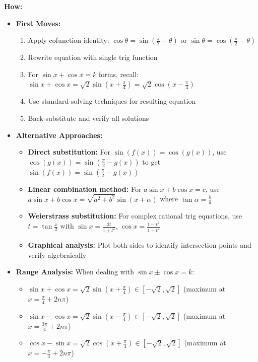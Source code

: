 \documentclass[12pt]{article}
\begin{document}
\textbf{How:}
\begin{itemize}
    \item \textbf{First Moves:} 
    \begin{enumerate}
        \item Apply cofunction identity: $\cos\theta = \sin\left(\frac{\pi}{2} - \theta\right)$ or $\sin\theta = \cos\left(\frac{\pi}{2} - \theta\right)$
        \item Rewrite equation with single trig function
        \item For $\sin x + \cos x = k$ forms, recall: $\sin x + \cos x = \sqrt{2}\sin(x + \frac{\pi}{4}) = \sqrt{2}\cos(x - \frac{\pi}{4})$
        \item Use standard solving techniques for resulting equation
        \item Back-substitute and verify all solutions
    \end{enumerate}
    \item \textbf{Alternative Approaches:}
    \begin{itemize}
        \item \textbf{Direct substitution:} For $\sin(f(x)) = \cos(g(x))$, use $\cos(g(x)) = \sin(\frac{\pi}{2} - g(x))$ to get $\sin(f(x)) = \sin(\frac{\pi}{2} - g(x))$
        \item \textbf{Linear combination method:} For $a\sin x + b\cos x = c$, use $a\sin x + b\cos x = \sqrt{a^2 + b^2}\sin(x + \alpha)$ where $\tan\alpha = \frac{b}{a}$
        \item \textbf{Weierstrass substitution:} For complex rational trig equations, use $t = \tan\frac{x}{2}$ with $\sin x = \frac{2t}{1+t^2}$, $\cos x = \frac{1-t^2}{1+t^2}$
        \item \textbf{Graphical analysis:} Plot both sides to identify intersection points and verify algebraically
    \end{itemize}
    \item \textbf{Range Analysis:} When dealing with $\sin x \pm \cos x = k$:
    \begin{itemize}
        \item $\sin x + \cos x = \sqrt{2}\sin(x + \frac{\pi}{4}) \in [-\sqrt{2}, \sqrt{2}]$ (maximum at $x = \frac{\pi}{4} + 2n\pi$)
        \item $\sin x - \cos x = \sqrt{2}\sin(x - \frac{\pi}{4}) \in [-\sqrt{2}, \sqrt{2}]$ (maximum at $x = \frac{3\pi}{4} + 2n\pi$)
        \item $\cos x - \sin x = \sqrt{2}\cos(x + \frac{\pi}{4}) \in [-\sqrt{2}, \sqrt{2}]$ (maximum at $x = -\frac{\pi}{4} + 2n\pi$)

\end{itemize}
\end{itemize}
\end{document}
